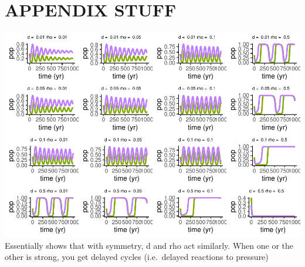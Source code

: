 \documentclass[
]{article}
\begin{document}
\hypertarget{appendix-stuff}{%
\section{APPENDIX STUFF}\label{appendix-stuff}}

\includegraphics{SubmissionFigs_files/figure-latex/influenceBoth-1.pdf}
Essentially shows that with symmetry, d and rho act similarly. When one or the other is strong, you get delayed cycles (i.e.~delayed reactions to pressure)
\end{document}
